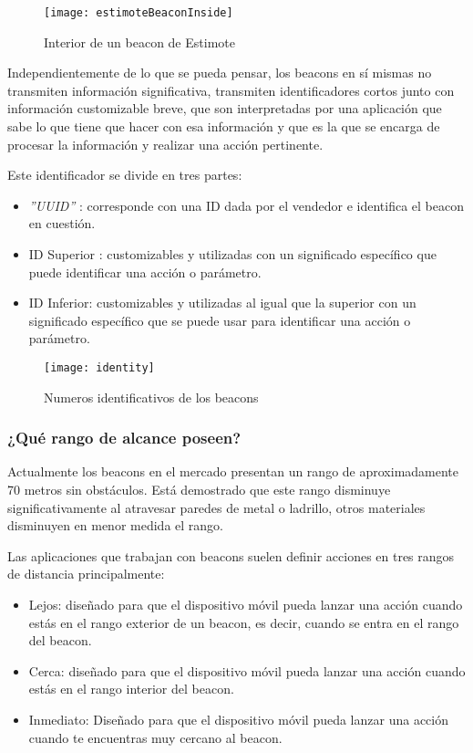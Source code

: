 \begin{figure}[h]
	\centering
	\texttt{[image: estimoteBeaconInside]}
	\caption{Interior de un beacon de Estimote}
	\label{fig:beaconInside}
\end{figure}

Independientemente de lo que se pueda pensar, los beacons en sí mismas no transmiten información significativa, transmiten identificadores cortos junto con información customizable breve, que son interpretadas por una aplicación que sabe lo que tiene que hacer con esa información y que es la que se encarga de procesar la información y realizar una acción pertinente.

Este identificador se divide en tres partes: 

\begin{itemize}
\item \textit{''UUID''} \cite{URL::UUID} : corresponde con una ID dada por el vendedor e identifica el beacon en cuestión.
\item ID Superior : customizables y utilizadas con un significado específico que puede identificar una acción o parámetro. 
\item ID Inferior: customizables y utilizadas al igual que la superior con un significado específico que se puede usar para identificar una acción o parámetro.
\end{itemize}

\begin{figure}[h]
	\centering
	\texttt{[image: identity]}
	\caption{Numeros identificativos de los beacons}
	\label{fig:beaconId}
\end{figure}

\subsubsection{¿Qué rango de alcance poseen?}

Actualmente los beacons en el mercado presentan un rango de aproximadamente 70 metros sin obstáculos. Está demostrado que este rango disminuye significativamente al atravesar paredes de metal o ladrillo, otros materiales disminuyen en menor medida el rango. 

Las aplicaciones que trabajan con beacons suelen definir acciones en tres rangos de distancia principalmente: 

\begin{itemize}
\item Lejos: diseñado para que el dispositivo móvil pueda lanzar una acción cuando estás en el rango exterior de un beacon, es decir, cuando se entra en el rango del beacon.
\item Cerca: diseñado para que el dispositivo móvil pueda lanzar una acción cuando estás en el rango interior del beacon. 
\item Inmediato: Diseñado para que el dispositivo móvil pueda lanzar una acción cuando te encuentras muy cercano al beacon.
\end{itemize}

